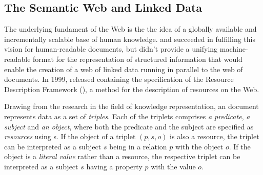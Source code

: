 \documentclass{book}
\begin{document}

      \subsection{The Semantic Web and Linked Data}
        The underlying fundament of the Web is the the idea of a globally
        available and incrementally scalable base of human knowledge.
         and  succeeded in fulfilling this vision
        for human-readable documents, but didn't provide a unifying
        machine-readable format for the representation of structured information
        that would enable the creation of a web of linked data running in
        parallel to the web of documents. In 1999,  released
        \cite{lassira99} containing the specification of the Resource
        Description Framework (), a method for the description of
        resources on the Web.

        Drawing from the research in the field of knowledge representation, an
         document represents data as a set of \emph{triples}. Each
        of the triplets comprises \emph{a predicate}, \emph{a subject} and
        \emph{an object}, where both the predicate and the subject are specified
        as \emph{resources} using s. If the object of a
        triplet $(p,s,o)$ is also a resource, the triplet can be interpreted as
        a subject $s$ being in a relation $p$ with the object $o$. If the object
        is a \emph{literal value} rather than a resource, the respective triplet
        can be interpreted as a subject $s$ having a property $p$ with the value
        $o$.
\end{document}
